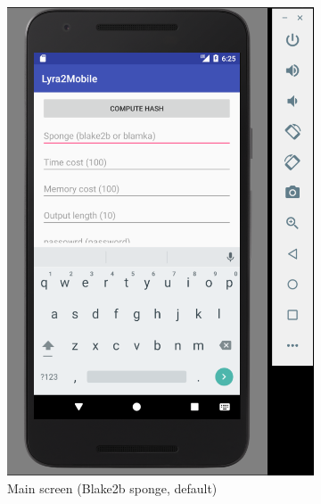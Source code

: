 \begin{figure}[H]
\centering
\begin{subfigure}{.5\textwidth}
  \centering
  \includegraphics[width=.8\linewidth]{figures/lyra2-mobile-main-clean}
  \caption{Main screen (Blake2b sponge, default)}
  \label{fig:lyra2-mobile-main}
\end{subfigure}%
\begin{subfigure}{.5\textwidth}
  \centering

\end{subfigure}
\end{figure}
